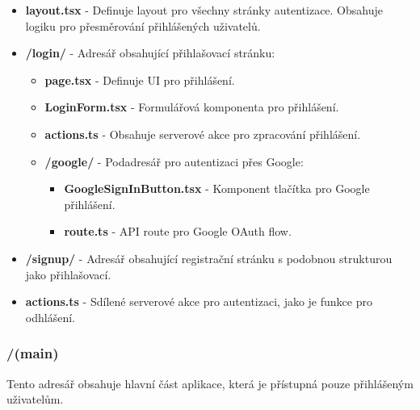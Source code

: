 \documentclass[12pt]{article}
\begin{document}
\begin{itemize}
  \item \textbf{layout.tsx} - Definuje layout pro všechny stránky autentizace. Obsahuje logiku pro přesměrování přihlášených uživatelů.
  
  \item \textbf{/login/} - Adresář obsahující přihlašovací stránku:
  \begin{itemize}
    \item \textbf{page.tsx} - Definuje UI pro přihlášení.
    \item \textbf{LoginForm.tsx} - Formulářová komponenta pro přihlášení.
    \item \textbf{actions.ts} - Obsahuje serverové akce pro zpracování přihlášení.
    \item \textbf{/google/} - Podadresář pro autentizaci přes Google:
    \begin{itemize}
      \item \textbf{GoogleSignInButton.tsx} - Komponent tlačítka pro Google přihlášení.
      \item \textbf{route.ts} - API route pro Google OAuth flow.
    \end{itemize}
  \end{itemize}
  
  \item \textbf{/signup/} - Adresář obsahující registrační stránku s podobnou strukturou jako přihlašovací.
  
  \item \textbf{actions.ts} - Sdílené serverové akce pro autentizaci, jako je funkce pro odhlášení.
\end{itemize}

\subsubsection{/(main)}

Tento adresář obsahuje hlavní část aplikace, která je přístupná pouze přihlášeným uživatelům.
\end{document}
